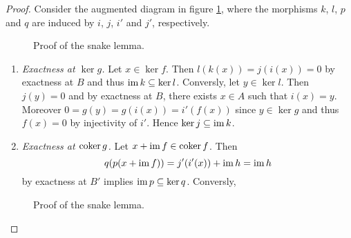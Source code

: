 \begin{proof}
	Consider the augmented diagram in figure \ref{fig:snake_lemma}, where the morphisms $k$, $l$, $p$ and $q$ are induced by $i$, $j$, $i'$ and $j'$, respectively.
	\begin{figure}[h!tb]
		\centering
		\caption{Proof of the snake lemma.}
		\label{fig:snake_lemma}
	\end{figure}

	\begin{enumerate}[label = \textit{Step \arabic*:},wide = 0pt, itemsep = 1.5ex]
		\item \textit{Exactness at $\ker g$.} Let $x \in \ker f$. Then $l(k(x)) = j(i(x)) = 0$ by exactness at $B$ and thus $\operatorname{im} k \subseteq \ker l$. Conversly, let $y \in \ker l$. Then $j(y) = 0$ and by exactness at $B$, there exists $x \in A$ such that $i(x) = y$. Moreover $0 = g(y) = g(i(x)) = i'(f(x))$ since $y \in \ker g$ and thus $f(x) = 0$ by injectivity of $i'$. Hence $\ker j \subseteq \operatorname{im} k$.
		\item \textit{Exactness at $\operatorname{coker} g$.} Let $x + \operatorname{im} f \in \operatorname{coker} f$. Then
			\begin{equation*}
				q(p(x + \operatorname{im} f)) = j'(i'(x)) + \operatorname{im} h = \operatorname{im} h
			\end{equation*}
			\noindent by exactness at $B'$ implies $\operatorname{im} p \subseteq \ker q$. Conversly,
	\end{enumerate}
	\begin{figure}[h!tb]
		\centering
		\caption{Proof of the snake lemma.}
		\label{fig:snake_lemma_delta}
	\end{figure}
\end{proof}

